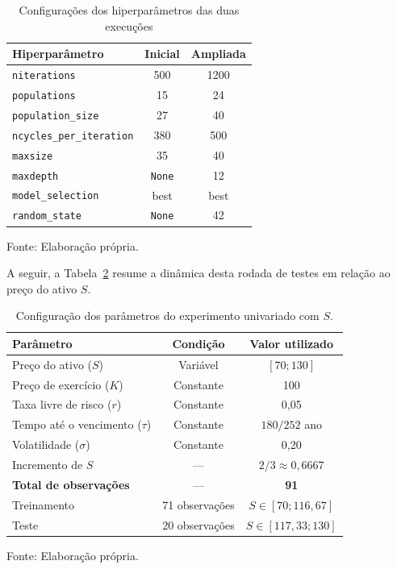 \begin{table}[htbp]
    \centering
    \caption{Configurações dos hiperparâmetros das duas execuções}
    \label{tab:configuracoes_pysr_S}

    \begin{tabular}{lcc}
        \hline
        \textbf{Hiperparâmetro} &
        \textbf{Inicial} &
        \textbf{Ampliada} \\
        \hline
        \texttt{niterations} & 500 & 1200 \\
        \texttt{populations} & 15 & 24 \\
        \texttt{population\_size} & 27 & 40 \\
        \texttt{ncycles\_per\_iteration} & 380 & 500 \\
        \texttt{maxsize} & 35 & 40 \\
        \texttt{maxdepth} & \texttt{None} & 12 \\
        \texttt{model\_selection} & best & best \\
        \texttt{random\_state} & \texttt{None} & 42 \\
        \hline
    \end{tabular}

    \vspace{0.2cm}
    {\footnotesize Fonte: Elaboração própria.\par}
\end{table}
A seguir, a Tabela~\ref{tab:parametros_S} resume a dinâmica desta rodada de testes em relação ao preço do ativo $S$.
\begin{table}[H]
    \centering
    \caption{Configuração dos parâmetros do experimento univariado com $S$.}
    \label{tab:parametros_S}
    
    \begin{tabular}{lcc}
        \hline
        \textbf{Parâmetro} & \textbf{Condição} & \textbf{Valor utilizado} \\
        \hline
        Preço do ativo ($S$) & Variável & $[70;130]$ \\
        Preço de exercício ($K$) & Constante & 100 \\
        Taxa livre de risco ($r$) & Constante & 0,05 \\
        Tempo até o vencimento ($\tau$) & Constante & $180/252$ ano \\
        Volatilidade ($\sigma$) & Constante & 0,20 \\
        Incremento de $S$ & --- & $2/3 \approx 0,6667$ \\
        \hline
        \textbf{Total de observações} & --- & \textbf{91} \\
        \hline
        Treinamento & 71 observações & $S \in [70;116,67]$ \\
        Teste & 20 observações & $S \in [117,33;130]$ \\
        \hline
    \end{tabular}

    \vspace{0.2cm}
    {\footnotesize Fonte: Elaboração própria.\par}
\end{table}

